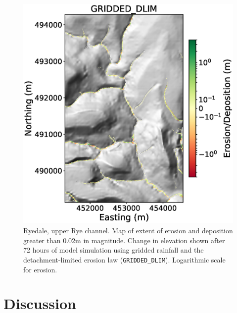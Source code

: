 \begin{figure}[htb]
\includegraphics[width=16cm]{chp06_figures_scripts/figure_ryedale_elev_diff_grid_dlim_UPPER.eps}
\caption{Ryedale, upper Rye channel. Map of extent of erosion and deposition greater than 0.02m in magnitude. Change in elevation shown after 72 hours of model simulation using gridded rainfall and the detachment-limited erosion law (\texttt{GRIDDED\_DLIM}). Logarithmic scale for erosion.}
\label{fig_ryedale_erodediff_UPPER_gridded_dlim}
\end{figure}

\section{Discussion}

